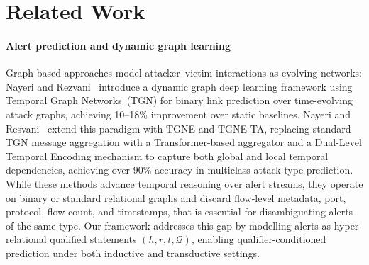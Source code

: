 \documentclass[10pt,journal,compsoc]{IEEEtran}
\begin{document}

\section{Related Work}
\label{sec:related}

\paragraph*{Alert prediction and dynamic graph learning}
Graph-based
approaches model attacker--victim interactions as
evolving networks: Nayeri and Rezvani~\cite{nayeri2024alert} introduce
a dynamic graph deep learning framework using Temporal
Graph Networks~(TGN) for binary link prediction over
time-evolving attack graphs, achieving 10--18\%
improvement over static baselines. Nayeri and Resvani~\cite{nayeri2026alert}
extend this paradigm with TGNE and TGNE-TA, replacing
standard TGN message aggregation with a
Transformer-based aggregator and a Dual-Level Temporal
Encoding mechanism to capture both global and local
temporal dependencies, achieving over 90\% accuracy in
multiclass attack type prediction. While these methods
advance temporal reasoning over alert streams, they
operate on binary or standard relational graphs and
discard flow-level metadata, port, protocol, flow
count, and timestamps, that is essential for
disambiguating alerts of the same type. Our framework
addresses this gap by modelling alerts as hyper-relational
qualified statements $(h, r, t, \mathcal{Q})$, enabling
qualifier-conditioned prediction under both inductive
and transductive settings.
%
\end{document}
